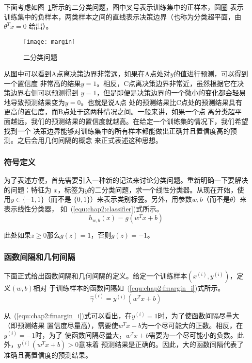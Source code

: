 下面考虑如图~\ref{fig:margin}所示的二分类问题，图中叉号表示训练集中的正样本，圆圈
表示训练集中的负样本，两类样本之间的直线表示决策边界（也称为分类超平面，由$\theta^Tx = 0$
给出）。
\begin{figure}[ht] %
  \centering
  \texttt{[image: margin]}
  \caption{二分类问题}
  \label{fig:margin}
\end{figure}

从图中可以看到A点离决策边界非常远，如果在A点处对$y$的值进行预测，可以得到一个置信度
非常高的结果$y = 1$。相反，C点离决策边界非常近，虽然根据它在决策边界右侧可以预测得到
$y = 1$，但是即便是决策边界的一个微小的变化都会轻易地导致预测结果变为$y = 0$。也就是说A点
处的预测结果比C点处的预测结果具有更高的置信度，而B点处于这两种情况之间。一般来讲，如果一个点
离分类超平面越远，我们的预测结果的置信度就越高。在给定一个训练集的情况下，我们希望找到一个
决策边界能够对训练集中的所有样本都能做出正确并且置信度高的预测。之后会用几何间隔的概念
来正式表述这种思想。

\subsubsection{符号定义}

为了表述方便，首先需要引入一种新的记法来讨论分类问题。重新明确一下要解决的问题：特征为
$x$，标签为$y$的二分类问题，求一个线性分类器。从现在开始，使用$y \in \{-1, 1\}$（而不是
$\{0, 1\}$）来表示类别标签。另外，用参数$w, b$（而不是$\theta$）来表示线性分类器，
如~(\ref{equ:chap2:classifier})式所示。
\begin{equation}
  \label{equ:chap2:classifier}
  h_{w,b}(x) = g(w^Tx+b)
\end{equation}

此处如果$z \geq 0$那么$g(z) = 1$，否则$g(z) = -1$。

\subsubsection{函数间隔和几何间隔}

下面正式给出函数间隔和几何间隔的定义。给定一个训练样本$(x^{(i)},y^{(i)})$，定义$(w,b)$相对
于训练样本的函数间隔如~(\ref{equ:chap2:fmargin_i})式所示。
\begin{equation}
  \label{equ:chap2:fmargin_i}
  \hat{\gamma}^{(i)} = y^{(i)}(w^Tx+b)
\end{equation}

从~(\ref{equ:chap2:fmargin_i})式可以看出，在$y^{(i)} = 1$时，为了使函数间隔尽量大（即预测结果
置信度尽量高），需要使$w^Tx+b$为一个尽可能大的正数。相反，在$y^{(i)} = -1$时，为了
使函数间隔尽量大，$w^Tx+b$需要为一个尽可能小的负数。此外，$y^{(i)}(w^Tx+b) > 0$意味着
预测结果是正确的。因此，大的函数间隔代表了准确且高置信度的预测结果。


